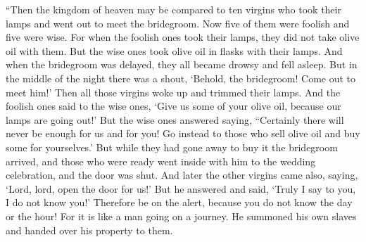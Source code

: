 \begin{biblechapter} %
 “Then the kingdom of heaven may be compared to ten virgins who took their lamps and went out to meet the bridegroom.
\verse Now five of them were foolish and five were wise.
\verse For when the foolish ones took their lamps, they did not take olive oil with them.
\verse But the wise ones took olive oil in flasks with their lamps.
\verse And when the bridegroom was delayed, they all became drowsy and fell asleep.
\verse But in the middle of the night there was a shout, ‘Behold, the bridegroom! Come out to meet him!’
\verse Then all those virgins woke up and trimmed their lamps.
\verse And the foolish ones said to the wise ones, ‘Give us some of your olive oil, because our lamps are going out!’
\verse But the wise ones answered saying, “Certainly there will never be enough for us and for you! Go instead to those who sell olive oil and buy some for yourselves.’
\verse But while they had gone away to buy it the bridegroom arrived, and those who were ready went inside with him to the wedding celebration, and the door was shut.
\verse And later the other virgins came also, saying, ‘Lord, lord, open the door for us!’
\verse But he answered and said, ‘Truly I say to you, I do not know you!’
\verse Therefore be on the alert, because you do not know the day or the hour!
 For it is like a man going on a journey. He summoned his own slaves and handed over his property to them.

\end{biblechapter}
